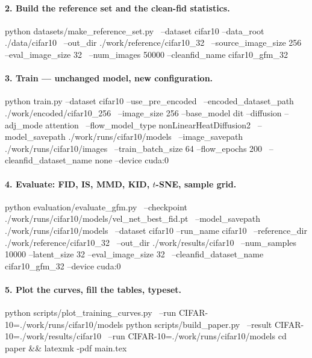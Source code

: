 \documentclass[11pt]{article}
\begin{document}
\paragraph{2. Build the reference set and the clean-fid statistics.}
\begin{shell}
python datasets/make_reference_set.py \
    --dataset cifar10 --data_root ./data/cifar10 \
    --out_dir ./work/reference/cifar10_32 \
    --source_image_size 256 --eval_image_size 32 \
    --num_images 50000 --cleanfid_name cifar10_gfm_32
\end{shell}

\paragraph{3. Train --- unchanged model, new configuration.}
\begin{shell}
python train.py --dataset cifar10 --use_pre_encoded \
    --encoded_dataset_path ./work/encoded/cifar10_256 \
    --image_size 256 --base_model dit --diffusion --adj_mode attention \
    --flow_model_type nonLinearHeatDiffusion2 \
    --model_savepath ./work/runs/cifar10/models \
    --image_savepath ./work/runs/cifar10/images \
    --train_batch_size 64 --flow_epochs 200 \
    --cleanfid_dataset_name none --device cuda:0
\end{shell}

\paragraph{4. Evaluate: FID, IS, MMD, KID, $t$-SNE, sample grid.}
\begin{shell}
python evaluation/evaluate_gfm.py \
    --checkpoint ./work/runs/cifar10/models/vel_net_best_fid.pt \
    --model_savepath ./work/runs/cifar10/models \
    --dataset cifar10 --run_name cifar10 \
    --reference_dir ./work/reference/cifar10_32 \
    --out_dir ./work/results/cifar10 \
    --num_samples 10000 --latent_size 32 --eval_image_size 32 \
    --cleanfid_dataset_name cifar10_gfm_32 --device cuda:0
\end{shell}

\paragraph{5. Plot the curves, fill the tables, typeset.}
\begin{shell}
python scripts/plot_training_curves.py \
    --run CIFAR-10=./work/runs/cifar10/models
python scripts/build_paper.py \
    --result CIFAR-10=./work/results/cifar10 \
    --run CIFAR-10=./work/runs/cifar10/models
cd paper && latexmk -pdf main.tex
\end{shell}



\end{document}

